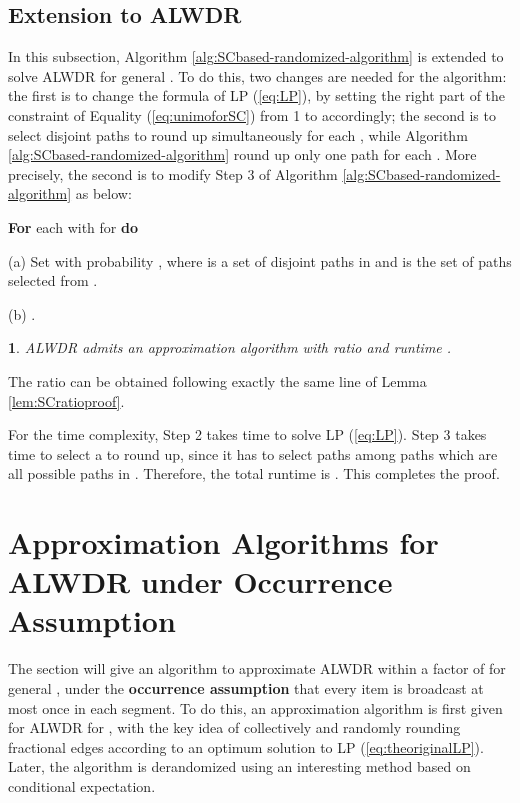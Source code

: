 \documentclass[11pt,english,onecolumn,draftcls]{IEEEtran}
\theoremstyle{plain}
\theoremstyle{plain}
\theoremstyle{plain}
\newtheorem{lem}[thm]{\protect\lemmaname}
\theoremstyle{plain}
\providecommand{\lemmaname}{Lemma}
\begin{document}
\subsection{Extension to ALWDR}

In this subsection, Algorithm \ref{alg:SCbased-randomized-algorithm}
is extended to solve ALWDR for general . To do this,
two changes are needed for the algorithm: the first is to change the
formula of LP (\ref{eq:LP}), by setting the right part of the constraint
of Equality (\ref{eq:unimoforSC}) from 1 to  accordingly;
the second is to select  disjoint paths to round up simultaneously
for each , while Algorithm \ref{alg:SCbased-randomized-algorithm}
round up only one path for each . More precisely,
the second is to modify Step 3 of Algorithm \ref{alg:SCbased-randomized-algorithm}
as below:

\textbf{For} each 
with  for \textbf{
do }

\quad{}(a) Set 
with probability ,
where  is a set of 
disjoint paths in  and  is
the set of  paths selected from .

\quad{}(b) .
\begin{lem}
\label{lem:aArLWDRratioandtime}ALWDR admits an
approximation algorithm with ratio  and runtime .\end{lem}
\begin{IEEEproof}
The ratio can be obtained following exactly the same line of Lemma
\ref{lem:SCratioproof}.

For the time complexity, Step 2 takes 
time to solve LP (\ref{eq:LP}). Step 3 takes  time to select a  to round up, since it has to select
 paths among  paths which are all possible paths
in . Therefore, the total runtime is .
This completes the proof.
\end{IEEEproof}

\section{Approximation Algorithms for ALWDR under Occurrence
Assumption}

The section will give an algorithm to approximate ALWDR
within a factor of  for general , under the
\textbf{occurrence assumption} that every item is broadcast at most
once in each segment. To do this, an approximation algorithm is first
given for ALWDR for , with the key idea
of collectively and randomly rounding fractional edges according to
an optimum solution to LP (\ref{eq:theoriginalLP}). Later, the algorithm
is derandomized using an interesting method based on conditional expectation.
\end{document}
